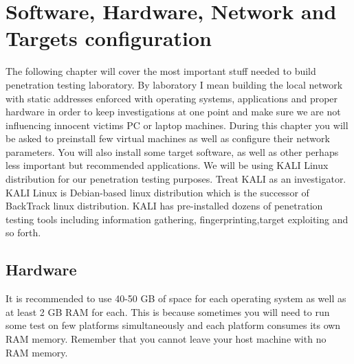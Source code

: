 
\section{Software, Hardware, Network and Targets configuration}
\label{sec:sys_config}
The following chapter will cover the most important stuff needed to build penetration testing laboratory.
By laboratory I mean building the local network with static addresses enforced with operating systems, applications and proper hardware in order to keep
investigations at one point and make sure we are not influencing innocent victims PC or laptop machines.
During this chapter you will be asked to preinstall few virtual machines as well as configure their network parameters.
You will also install some target software, as well as other perhaps less important but recommended applications.
We will be using KALI Linux distribution for our penetration testing purposes.
Treat KALI as an investigator.
KALI Linux is Debian-based linux distribution which is the successor of BackTrack linux distribution.
KALI has pre-installed  dozens of penetration testing tools including information gathering, fingerprinting,target exploiting and so forth.
\subsection{Hardware}
It is recommended to use 40-50 GB of space for each operating system as well as at least 2 GB RAM for each.
This is because sometimes you will need to
run some test on few platforms simultaneously and each platform consumes its own RAM memory.
Remember that you cannot leave your host machine with no RAM memory.
